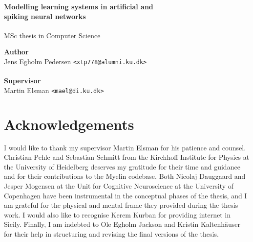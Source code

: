 \documentclass[a4paper,oneside]{memoir}
\begin{document}
\newcommand{\obar}{%
    \mathrel{\reflectbox{\rotatebox[origin=c]{90}{$\ominus$}}}}

    \thispagestyle{empty}
    \begin{adjustwidth}{-3cm}{-1.5cm}
      \vspace*{3cm}
      \textbf{\Huge Modelling learning systems in artificial and \\spiking
      neural networks} \\
      \\[1.6cm]
      {\Large MSc thesis in Computer Science}
      \\[9cm]
      \begin{tabbing}
      \textbf{\Large Author} \\
      Jens Egholm Pedersen \hspace{1cm} \= \texttt{<xtp778@alumni.ku.dk>} \\
      \\[1cm]
      \textbf{\Large Supervisor} \\
      Martin Elsman \hspace{1cm} \= \texttt{<mael@di.ku.dk>}
      \end{tabbing}
    \end{adjustwidth}

    \newpage

    \ClearWallPaper

\renewcommand\cftchapteraftersnumb{\normalfont}
\renewcommand\cftbeforechapterskip{5pt plus 1pt}

\frontmatter


\pagebreak

\setcounter{tocdepth}{2}
\tableofcontents*
\newpage

\chapter*{Acknowledgements}
I would like to thank my supervisor Martin Elsman for his patience and counsel. 
Christian Pehle and Sebastian Schmitt from the Kirchhoff-Institute for Physics
at the University of Heidelberg deserves my gratitude for their time and
guidance and for their contributions to the Myelin codebase.
Both Nicolaj Dauggaard and Jesper Mogensen at the Unit for Cognitive
Neuroscience at the University of Copenhagen have been instrumental in the
conceptual phases of the thesis, and I am grateful for the physical and mental
frame they provided during the thesis work.
I would also like to recognise Kerem Kurban for providing internet in Sicily.
Finally, I am indebted to Ole Egholm Jackson and Kristin Kaltenhäuser for
their help in structuring and revising the final versions of the thesis.
\mainmatter
\end{document}
